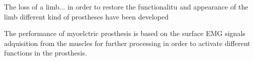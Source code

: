 The loss of a limb... in order to restore the functionalitu and appearance of the limb different kind of prostheses have been developed 

The performance of myoelctric prosthesis is based on the surface EMG signals adquisition from the muscles for further processing in order to activate different functions in the prosthesis. 
